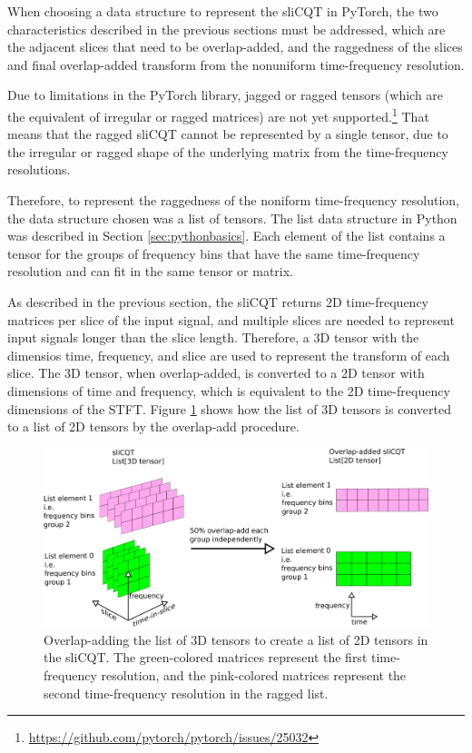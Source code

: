 \documentclass[report.tex]{subfiles}
\begin{document}
When choosing a data structure to represent the sliCQT in PyTorch, the two characteristics described in the previous sections must be addressed, which are the adjacent slices that need to be overlap-added, and the raggedness of the slices and final overlap-added transform from the nonuniform time-frequency resolution.

Due to limitations in the PyTorch library, jagged or ragged tensors (which are the equivalent of irregular or ragged matrices) are not yet supported.\footnote{\url{https://github.com/pytorch/pytorch/issues/25032}} That means that the ragged sliCQT cannot be represented by a single tensor, due to the irregular or ragged shape of the underlying matrix from the time-frequency resolutions.

Therefore, to represent the raggedness of the noniform time-frequency resolution, the data structure chosen was a list of tensors. The list data structure in Python was described in Section \ref{sec:pythonbasics}. Each element of the list contains a tensor for the groups of frequency bins that have the same time-frequency resolution and can fit in the same tensor or matrix.

As described in the previous section, the sliCQT returns 2D time-frequency matrices per slice of the input signal, and multiple slices are needed to represent input signals longer than the slice length. Therefore, a 3D tensor with the dimensios time, frequency, and slice are used to represent the transform of each slice. The 3D tensor, when overlap-added, is converted to a 2D tensor with dimensions of time and frequency, which is equivalent to the 2D time-frequency dimensions of the STFT. Figure \ref{fig:3dslicqola2d} shows how the list of 3D tensors is converted to a list of 2D tensors by the overlap-add procedure.

\begin{figure}[ht]
	\centering
	\includegraphics[width=\textwidth]{./images-blockdiagrams/3dslicqola2d.png}
	\caption{Overlap-adding the list of 3D tensors to create a list of 2D tensors in the sliCQT. The green-colored matrices represent the first time-frequency resolution, and the pink-colored matrices represent the second time-frequency resolution in the ragged list.}
	\label{fig:3dslicqola2d}
\end{figure}
\end{document}
